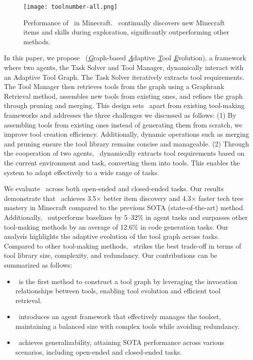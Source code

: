 \begin{figure}[t]
\begin{center}
\centerline{\texttt{[image: toolnumber-all.png]}}
\vskip -0.1in
\caption{Performance of \ours\ in Minecraft. \ours\ continually discovers new Minecraft items and skills during exploration, significantly outperforming other methods.}
\label{fig:toolnumber-all}
\end{center}
\vskip -0.3in
\end{figure}
In this paper, we propose \ours\ (\underline{\textit{G}}raph-based \underline{\textit{A}}daptive \underline{\textit{T}}ool \underline{\textit{E}}volution), a framework where two agents, the Task Solver and Tool Manager, dynamically interact with an Adaptive Tool Graph. The Task Solver iteratively extracts tool requirements. The Tool Manager then retrieves tools from the graph using a Graphrank Retrieval method, assembles new tools from existing ones, and refines the graph through pruning and merging. This design sets \ours\ apart from existing tool-making frameworks and addresses the three challenges we discussed as follows: (1) By assembling tools from existing ones instead of generating them from scratch, we improve tool creation efficiency. Additionally, dynamic operations such as merging and pruning ensure the tool library remains concise and manageable. (2) Through the cooperation of two agents, \ours\ dynamically extracts tool requirements based on the current environment and task, converting them into tools. This enables the system to adapt effectively to a wide range of tasks.



We evaluate \ours\ across both open-ended and closed-ended tasks. Our results demonstrate that \ours\ achieves 3.5× better item discovery and 4.3× faster tech tree mastery in Minecraft compared to the previous SOTA (state-of-the-art) method. Additionally, \ours\ outperforms baselines by 5–32\% in agent tasks and surpasses other tool-making methods by an average of 12.6\% in code generation tasks. Our analysis highlights the adaptive evolution of the tool graph across tasks. Compared to other tool-making methods, \ours\ strikes the best trade-off in terms of tool library size, complexity, and redundancy. Our contributions can be summarized as follows:
\begin{itemize}
     \setlength{\itemsep}{0.1em} %
     \item \ours\ is the first method to construct a tool graph by leveraging the invocation relationships between tools, enabling tool evolution and efficient tool retrieval.
     \item \ours\ introduces an agent framework that effectively manages the toolset, maintaining a balanced size with complex tools while avoiding redundancy.
     \item \ours\ achieves generalizability, attaining SOTA performance across various scenarios, including open-ended and closed-ended tasks.
\end{itemize}
   
